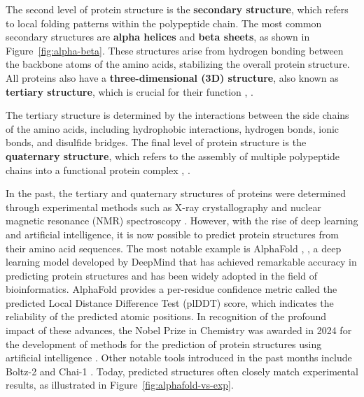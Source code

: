 The second level of protein structure is the \textbf{secondary structure}, which refers to local folding patterns within the polypeptide chain. The most common secondary structures are \textbf{alpha helices} and \textbf{beta sheets}, as shown in Figure~\ref{fig:alpha-beta}. These structures arise from hydrogen bonding between the backbone atoms of the amino acids, stabilizing the overall protein structure. All proteins also have a \textbf{three-dimensional (3D) structure}, also known as \textbf{tertiary structure}, which is crucial for their function \cite{nelson2008lehninger}, \cite{voet2010biochemistry}.

The tertiary structure is determined by the interactions between the side chains of the amino acids, including hydrophobic interactions, hydrogen bonds, ionic bonds, and disulfide bridges. The final level of protein structure is the \textbf{quaternary structure}, which refers to the assembly of multiple polypeptide chains into a functional protein complex \cite{nelson2008lehninger}, \cite{voet2010biochemistry}.

In the past, the tertiary and quaternary structures of proteins were determined through experimental methods such as X-ray crystallography and nuclear magnetic resonance (NMR) spectroscopy \cite{berman2000protein}. However, with the rise of deep learning and artificial intelligence, it is now possible to predict protein structures from their amino acid sequences. The most notable example is AlphaFold \cite{jumper2021highly}, \cite{abramson2024accurate}, a deep learning model developed by DeepMind that has achieved remarkable accuracy in predicting protein structures and has been widely adopted in the field of bioinformatics. AlphaFold provides a per-residue confidence metric called the predicted Local Distance Difference Test (plDDT) score\footnotemark[1], which indicates the reliability of the predicted atomic positions. In recognition of the profound impact of these advances, the Nobel Prize in Chemistry was awarded in 2024 for the development of methods for the prediction of protein structures using artificial intelligence \cite{abriata2024nobel}. Other notable tools introduced in the past months include Boltz-2 \cite{passaro2025boltz2} and Chai-1 \cite{chai2024chai}. Today, predicted structures often closely match experimental results, as illustrated in Figure~\ref{fig:alphafold-vs-exp}.


